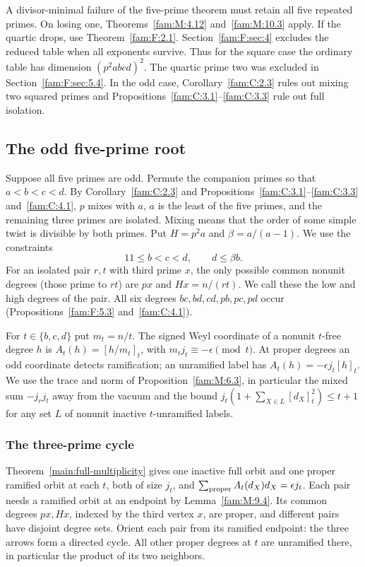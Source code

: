 \documentclass[11pt,a4paper]{article}
\numberwithin{equation}{section}
\theoremstyle{remark}
\begin{document}
A divisor-minimal failure of the five-prime theorem must retain all
five repeated primes. On losing one, Theorems~\ref{fam:M:4.12}
and~\ref{fam:M:10.3} apply. If the quartic drops, use
Theorem~\ref{fam:F:2.1}. Section~\ref{fam:F:sec:4} excludes the
reduced table when all exponents survive. Thus for the square case
the ordinary table has dimension $(p^2abcd)^2$. The quartic prime
two was excluded in Section~\ref{fam:F:sec:5.4}. In the odd case,
Corollary~\ref{fam:C:2.3} rules out mixing two squared primes and
Propositions~\ref{fam:C:3.1}--\ref{fam:C:3.3} rule out full isolation.

\subsection{The odd five-prime root}\label{fam:W:sec:3}
Suppose all five primes are odd. Permute the companion primes so that
$a<b<c<d$. By Corollary~\ref{fam:C:2.3} and Propositions~\ref{fam:C:3.1}--\ref{fam:C:3.3} and~\ref{fam:C:4.1}, $p$ mixes with
$a$, $a$ is the least of the five primes, and the remaining three primes
are isolated. Mixing means that the order of some simple twist is divisible
by both primes. Put $H=p^2a$ and $\beta=a/(a-1)$. We use the constraints
\[
  11\le b<c<d,\qquad d\le\beta b .
\]
For an isolated pair $r,t$ with third prime $x$, the only possible
common nonunit degrees (those prime to $rt$) are $px$ and $Hx=n/(rt)$.
We call these the low and high degrees of the pair. All six degrees
$bc,bd,cd,pb,pc,pd$ occur
(Propositions~\ref{fam:F:5.3} and~\ref{fam:C:4.1}).

For $t\in\{b,c,d\}$ put $m_t=n/t$. The signed Weyl coordinate of
a nonunit $t$-free degree $h$ is $A_t(h)=[h/m_t]_t$, with
$m_tj_t\equiv-\epsilon\pmod t$. At proper degrees an odd coordinate
detects ramification; an unramified label has
$A_t(h)=-\epsilon j_t[h]_t$. We use the trace and norm of
Proposition~\ref{fam:M:6.3}, in particular the mixed sum
$-j_rj_t$ away from the vacuum and the bound
$j_t(1+\sum_{X\in L}[d_X]_t^2)\le t+1$ for any set $L$ of
nonunit inactive $t$-unramified labels.

\subsubsection{The three-prime cycle}\label{fam:W:sec:3.1}\label{fam:W:n:sec:orbits}\label{fam:W:sec:3.2}
Theorem~\ref{main:full-multiplicity} gives one
inactive full orbit and one proper ramified orbit at each $t$,
both of size $j_t$, and $\sum_{\rm proper} A_t(d_X)d_X=\epsilon j_t$.
Each pair needs a ramified orbit at an endpoint by
Lemma~\ref{fam:M:9.4}. Its common degrees $px,Hx$, indexed by the
third vertex $x$, are proper, and different pairs have disjoint
degree sets. Orient each pair from its ramified endpoint: the three
arrows form a directed cycle. All other proper degrees at $t$ are
unramified there, in particular the product of its two neighbors.
\end{document}
